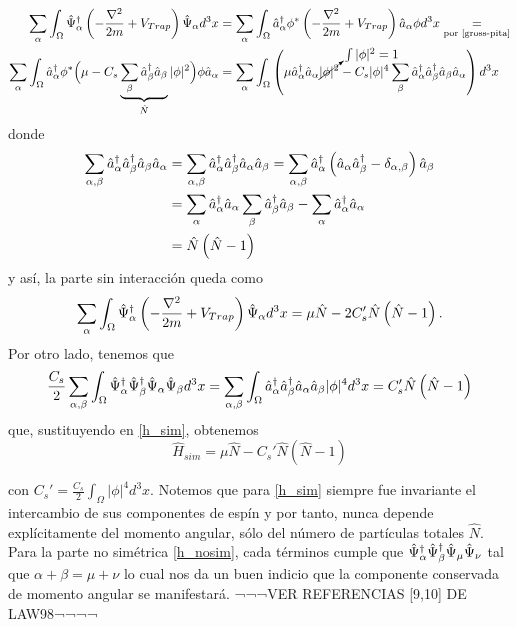 \begin{align*}
 \sum_\alpha \int_\Omega \hat{\Psi}^{\dagger}_\alpha \left( -\frac{\nabla^2}{2m} + V_{Trap} \right) \hat{\Psi}_{\alpha}d^3x &= \sum_\alpha \int_\Omega \hat{a}_{\alpha}^{\dagger} \phi^* \left( -\frac{\nabla^2}{2m} + V_{Trap} \right) \hat{a}_{\alpha} \phi d^3x \underset{\text{por \ref{gross-pita}}}{=} \\
\sum_\alpha \int_\Omega \hat{a}_{\alpha}^{\dagger} \phi^* \Big( \mu - C_s \underbrace{\sum_\beta \hat{a}_{\beta}^{\dagger}\hat{a}_{\beta}}_{\hat{N}} |\phi|^2 \Big) \phi \hat{a}_{\alpha} &= \sum_\alpha \int_\Omega \left( \mu\hat{a}_{\alpha}^{\dagger}\hat{a}_{\alpha} \cancelto{\int|\phi|^2 = 1}{|\phi|^2} - C_s|\phi|^4  \sum_\beta \hat{a}_{\alpha}^{\dagger} \hat{a}_{\beta}^{\dagger}\hat{a}_{\beta}\hat{a}_{\alpha} \right) d^3x 
\end{align*}
donde
\begin{align*}
\sum_{\alpha,\beta} \hat{a}_{\alpha}^{\dagger}\hat{a}_{\beta}^{\dagger}\hat{a}_{\beta}\hat{a}_{\alpha} & = \sum_{\alpha,\beta} \hat{a}_{\alpha}^{\dagger}\hat{a}_{\beta}^{\dagger}\hat{a}_{\alpha}\hat{a}_{\beta} = \sum_{\alpha,\beta} \hat{a}_{\alpha}^{\dagger} \left( \hat{a}_{\alpha}\hat{a}_{\beta}^{\dagger} - \delta_{\alpha,\beta} \right) \hat{a}_{\beta} \\
& = \sum_{\alpha} \hat{a}_{\alpha}^{\dagger}\hat{a}_{\alpha} \sum_\beta \hat{a}_{\beta}^{\dagger}\hat{a}_{\beta} - \sum_\alpha \hat{a}_{\alpha}^{\dagger}\hat{a}_{\alpha} \\ 
& = \hat{N}\left( \hat{N} - 1 \right)
\end{align*}
y así, la parte sin interacción queda como
\begin{align*}
\sum_\alpha \int_\Omega \hat{\Psi}^{\dagger}_\alpha \left( -\frac{\nabla^2}{2m} + V_{Trap} \right) \hat{\Psi}_{\alpha}d^3x = \mu \hat{N} - 2C_s'\hat{N}\left( \hat{N} - 1 \right).
\end{align*}
Por otro lado, tenemos que 
\begin{align*}
\frac{C_s}{2} \sum_{\alpha,\beta} \int_\Omega \hat{\Psi}^{\dagger}_\alpha\hat{\Psi}^{\dagger}_\beta\hat{\Psi}_{\alpha}\hat{\Psi}_{\beta} d^3x = \sum_{\alpha,\beta} \int_\Omega \hat{a}_{\alpha}^{\dagger}\hat{a}_{\beta}^{\dagger}\hat{a}_{\alpha}\hat{a}_{\beta} |\phi|^4 d^3x =  {C_s'} \hat{N}\left( \hat{N} - 1 \right)
\end{align*}
que, sustituyendo en \ref{h_sim}, obtenemos
\begin{equation}
\hat{H}_{sim} = \mu \hat{N} - C_s' \hat{N} \left( \hat{N} - 1 \right)
\label{h_sim_integ}
\end{equation}

con $C_s' = \frac{C_s}{2}\int_{\Omega}|\phi|^4d^3x$. Notemos que para \ref{h_sim} siempre fue invariante el intercambio de sus componentes de espín y por tanto, nunca depende explícitamente del momento angular, sólo del número de partículas totales $\hat{N}$. Para la parte no simétrica \ref{h_nosim}, cada términos cumple que $\hat{\Psi}^{\dagger}_\alpha\hat{\Psi}^{\dagger}_\beta\hat{\Psi}_{\mu}\hat{\Psi}_{\nu}$ tal que $\alpha + \beta = \mu + \nu$ lo cual nos da un buen indicio que la componente conservada de momento angular se manifestará. ¬¬¬VER REFERENCIAS [9,10] DE LAW98¬¬¬¬

